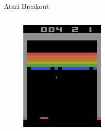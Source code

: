 \begin{frame}{Atari Breakout}
\begin{columns}[c,onlytextwidth]
            \begin{figure}
                \includegraphics[width=\textwidth]{images/gym-breakout-image-example.jpg}
            \end{figure}
    \end{columns}
\end{frame}
